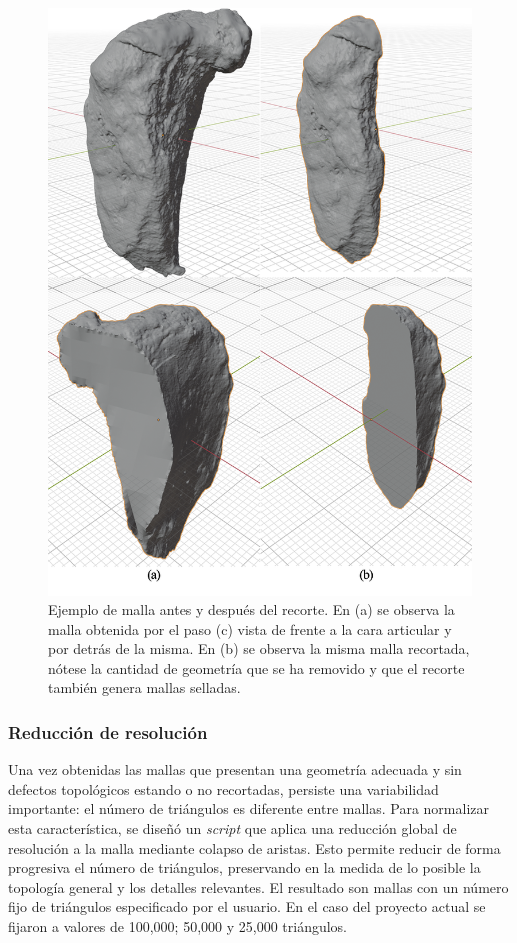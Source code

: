 \begin{figure}[htbp]
    \includegraphics[width=\linewidth]{figures/4_materials-methods/bbox_cut_sample.png}
    \caption[Ejemplo de malla antes y después del recorte]{Ejemplo de malla antes y después del recorte. En (a) se observa la malla obtenida por el paso (c) vista de frente a la cara articular y por detrás de la misma. En (b) se observa la misma malla recortada, nótese la cantidad de geometría que se ha removido y que el recorte también genera mallas selladas.}
    \label{bbox_cut_sample}
\end{figure}

\subsubsection{Reducción de resolución}
\label{section4:data_reduction}
Una vez obtenidas las mallas que presentan una geometría adecuada y sin defectos topológicos estando o no recortadas, persiste una variabilidad importante: el número de triángulos es diferente entre mallas. Para normalizar esta característica, se diseñó un \textit{script} que aplica una reducción global de resolución a la malla mediante colapso de aristas. Esto permite reducir de forma progresiva el número de triángulos, preservando en la medida de lo posible la topología general y los detalles relevantes. El resultado son mallas con un número fijo de triángulos especificado por el usuario. En el caso del proyecto actual se fijaron a valores de 100,000; 50,000 y 25,000 triángulos.

